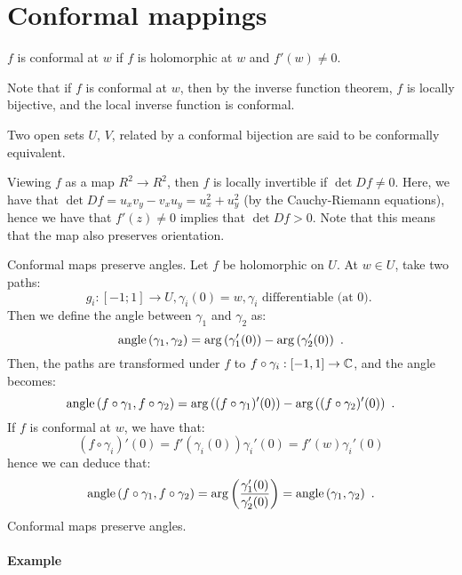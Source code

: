 \section{Conformal mappings}

\begin{definition}
  $f$ is conformal at $w$ if $f$ is holomorphic at $w$ and $f'(w) \neq 0$.
\end{definition}

Note that if $f$ is conformal at $w$, then by the inverse function theorem, $f$ is locally bijective, and the local inverse function is conformal.

Two open sets $U$, $V$, related by a conformal bijection are said to be conformally equivalent.

Viewing $f$ as a map $R^2 \rightarrow R^2$, then $f$ is locally invertible if $\det Df \neq 0$. Here, we have that $\det Df = u_xv_y - v_xu_y = u_x^2 + u_y^2$ (by the Cauchy-Riemann equations), hence we have that $f'(z) \neq 0$ implies that $\det Df > 0$. Note that this means that the map also preserves orientation.

Conformal maps preserve angles. Let $f$ be holomorphic on $U$. At $w \in U$, take two paths:
\[
g_i : [-1 ; 1] \rightarrow U, \gamma_i(0) = w, \gamma_i \text { differentiable (at 0). }
\]
Then we define the angle between $\gamma_1$ and $\gamma_2$ as:
\[
\text{angle}\left(\gamma_1, \gamma_2\right) = \arg \left(\gamma_1'(0)\right) - \arg \left(\gamma_2'(0)\right) \ \text{.}
\]
Then, the paths are transformed under $f$ to $f \circ \gamma_i : [-1, 1] \rightarrow \mathbb{C}$, and the angle becomes:
\[
\text{angle}\left(f \circ \gamma_1, f \circ \gamma_2\right) = \arg \left( (f \circ \gamma_1)'(0)\right) - \arg \left( (f \circ \gamma_2)'(0)\right) \ \text{.}
\]
If $f$ is conformal at $w$, we have that:
\[
(f \circ \gamma_i)'(0) = f'\left(\gamma_i(0)\right)\gamma_i'(0) = f'(w)\gamma_i'(0)
\]
hence we can deduce that:
\[
\text{angle}\left(f \circ \gamma_1, f \circ \gamma_2\right) = \arg\left(\frac{\gamma_1'(0)}{\gamma_2'(0)}\right) = \text{angle}\left(\gamma_1, \gamma_2\right) \ \text{.}
\]
Conformal maps preserve angles.

\paragraph{Example}

